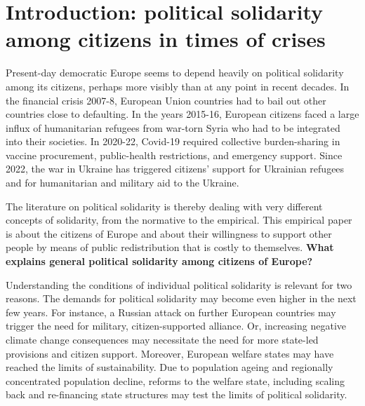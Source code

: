 \documentclass[12pt]{article}
\begin{document}
\newpage
\section{\texorpdfstring{Introduction: political solidarity among
citizens in times of crises}{Introduction: political solidarity among citizens in times of crises }}\label{introduction-political-solidarity-among-citizens-in-times-of-crises}

Present-day democratic Europe seems to depend heavily on political
solidarity among its citizens, perhaps more visibly than at any point in
recent decades. In the financial crisis 2007-8, European Union countries
had to bail out other countries close to defaulting. In the years
2015-16, European citizens faced a large influx of humanitarian refugees
from war-torn Syria who had to be integrated into their societies. In
2020-22, Covid-19 required collective burden-sharing in vaccine
procurement, public-health restrictions, and emergency support. Since
2022, the war in Ukraine has triggered citizens' support for Ukrainian
refugees and for humanitarian and military aid to the Ukraine.

The literature on political solidarity is thereby dealing with very
different concepts of solidarity, from the normative to the empirical.
This empirical paper is about the citizens of Europe and about their
willingness to support other people by means of public redistribution
that is costly to themselves. \textbf{What explains general political
solidarity among citizens of Europe?}

Understanding the conditions of individual political solidarity is
relevant for two reasons. The demands for political solidarity may
become even higher in the next few years. For instance, a Russian attack
on further European countries may trigger the need for military,
citizen-supported alliance. Or, increasing negative climate change
consequences may necessitate the need for more state-led provisions and
citizen support. Moreover, European welfare states may have reached the
limits of sustainability. Due to population ageing and regionally
concentrated population decline, reforms to the welfare state, including
scaling back and re-financing state structures may test the limits of
political solidarity.
\end{document}
